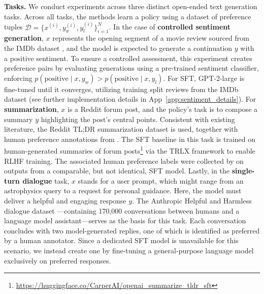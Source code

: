 \textbf{Tasks.} We conduct experiments across three distinct open-ended text generation tasks. Across all tasks, the methods learn a policy using a dataset of preference tuples $\mathcal{D}=\bigl\{x^{(i)}, y_w^{(i)}, y_l^{(i)}\bigr\}_{i=1}^N$. In the case of \textbf{controlled sentiment generation}, $x$ represents the opening segment of a movie review sourced from the IMDb dataset \cite{maas-EtAl:2011:ACL-HLT2011}, and the model is expected to generate a continuation $y$ with a positive sentiment. To ensure a controlled assessment, this experiment creates preference pairs by evaluating generations using a pre-trained sentiment classifier, enforcing $p(\text{positive}\mid x,y_w)>p(\text{positive}\mid x,y_l)$. For SFT, GPT-2-large is fine-tuned until it converges, utilizing training split reviews from the IMDb dataset (see further implementation details in App~\ref{app:sentiment_details}). For \textbf{summarization}, $x$ is a Reddit forum post, and the policy's task is to compose a summary $y$ highlighting the post’s central points. Consistent with existing literature, the Reddit TL;DR summarization dataset \citep{volske-etal-2017-tl} is used, together with human preference annotations from \citeauthor{stiennon2022learning}. The SFT baseline in this task is trained on human-generated summaries of forum posts\footnote{\url{https://huggingface.co/CarperAI/openai_summarize_tldr_sft}} via the TRLX framework \citep{leandro_von_werra_2023_7790115} to enable RLHF training. The associated human preference labels were collected by \citeauthor{stiennon2022learning} on outputs from a comparable, but not identical, SFT model. Lastly, in the \textbf{single-turn dialogue} task, $x$ stands for a user prompt, which might range from an astrophysics query to a request for personal guidance. Here, the model must deliver a helpful and engaging response $y$. The Anthropic Helpful and Harmless dialogue dataset \citep{bai2022training}—containing 170,000 conversations between humans and a language model assistant—serves as the basis for this task. Each conversation concludes with two model-generated replies, one of which is identified as preferred by a human annotator. Since a dedicated SFT model is unavailable for this scenario, we instead create one by fine-tuning a general-purpose language model exclusively on preferred responses.

